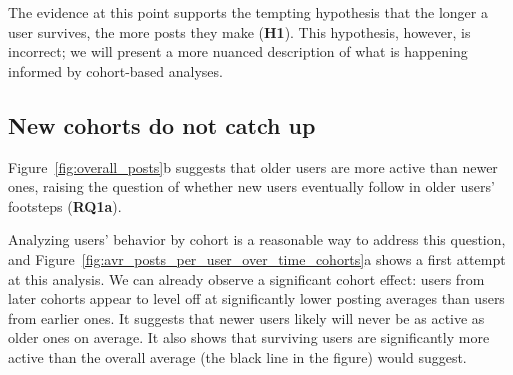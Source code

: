 The evidence at this point supports the tempting hypothesis that the longer a user survives, the more posts they make (\textbf{H1}).  This hypothesis, however, is incorrect; we will present a more nuanced description of what is happening informed by cohort-based analyses.

\subsection{New cohorts do not catch up}

\begin{figure*}[!tb]
\centering
{}
\caption{Figure (a) shows the average number of posts per active user over clock time and Figure (b) per active user in the user-time referential, both segmented by users' cohorts. The user cohort is defined by the year of the user's creation time.  For comparison, the black line in Figure (a) represents the overall average.}
\label{fig:avr_posts_per_user_over_time_cohorts}
\end{figure*}

Figure~\ref{fig:overall_posts}b suggests that older users are more active than newer ones, raising the question of whether new users
eventually follow in older users' footsteps (\textbf{RQ1a}).  

Analyzing users' behavior by cohort is a reasonable way to address this question, and Figure~\ref{fig:avr_posts_per_user_over_time_cohorts}a shows a first attempt at this analysis.  We can already observe a significant cohort effect: users from later cohorts appear to level off at significantly lower posting averages than users from earlier ones.  It suggests that newer users likely will never be as active as older ones on average.  It also shows that surviving users are significantly more active than the overall average (the black line in the figure) would suggest.

